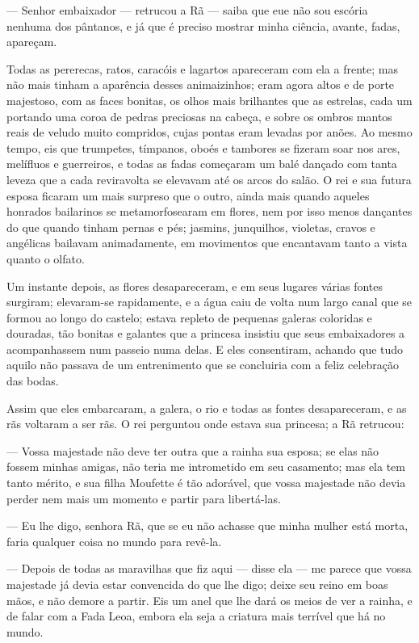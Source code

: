 — Senhor embaixador — retrucou a Rã — saiba que eue não sou escória
nenhuma dos pântanos, e já que é preciso mostrar minha ciência,
avante, fadas, apareçam.

Todas as pererecas, ratos, caracóis e lagartos apareceram com ela a
frente; mas não mais tinham a aparência desses animaizinhos; eram
agora altos e de porte majestoso, com as faces bonitas, os olhos mais
brilhantes que as estrelas, cada um portando uma coroa de pedras
preciosas na cabeça, e sobre os ombros mantos reais de veludo muito
compridos, cujas pontas eram levadas por anões. Ao mesmo tempo, eis
que trumpetes, tímpanos, oboés e tambores se fizeram soar nos ares,
melífluos e guerreiros, e todas as fadas começaram um balé dançado
com tanta leveza que a cada reviravolta se elevavam até os arcos do
salão. O rei e sua futura esposa ficaram um mais surpreso que o
outro, ainda mais quando aqueles honrados bailarinos se
metamorfosearam em flores, nem por isso menos dançantes do que quando
tinham pernas e pés; jasmins, junquilhos, violetas, cravos e
angélicas bailavam animadamente, em movimentos que encantavam tanto a
vista quanto o olfato.

Um instante depois, as flores desapareceram, e em seus lugares várias
fontes surgiram; elevaram-se rapidamente, e a água caiu de volta num
largo canal que se formou ao longo do castelo; estava repleto de
pequenas galeras coloridas e douradas, tão bonitas e galantes que a
princesa insistiu que seus embaixadores a acompanhassem num passeio
numa delas. E eles consentiram, achando que tudo aquilo não passava
de um entrenimento que se concluiria com a feliz celebração das
bodas. 

Assim que eles embarcaram, a galera, o rio e todas as fontes
desapareceram, e as rãs voltaram a ser rãs. O rei perguntou onde
estava sua princesa; a Rã retrucou:

— Vossa majestade não deve ter outra que a rainha sua esposa; se elas
não fossem minhas amigas, não teria me intrometido em seu casamento;
mas ela tem tanto mérito, e sua filha Moufette é tão adorável, que
vossa majestade não devia perder nem mais um momento e partir para
libertá-las. 

— Eu lhe digo, senhora Rã, que se eu não achasse que minha mulher está
morta, faria qualquer coisa no mundo para revê-la.

— Depois de todas as maravilhas que fiz aqui — disse ela — me parece
que vossa majestade já devia estar convencida do que lhe digo; deixe
seu reino em boas mãos, e não demore a partir. Eis um anel que lhe
dará os meios de ver a rainha, e de falar com a Fada Leoa, embora ela
seja a criatura mais terrível que há no mundo.

